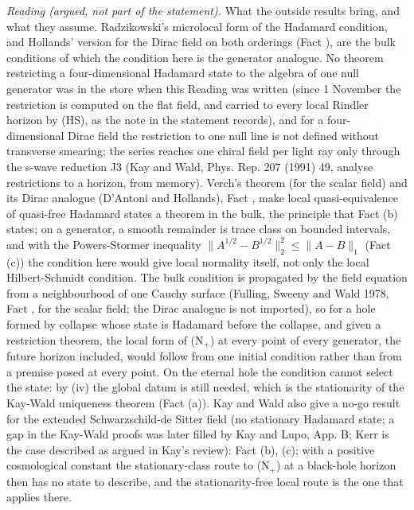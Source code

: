 \emph{Reading (argued, not part of the statement).} What the outside results bring, and what they assume. Radzikowski's microlocal form of the Hadamard condition, and Hollands' version for the Dirac field on both orderings (Fact ), are the bulk conditions of which the condition here is the generator analogue. No theorem restricting a four-dimensional Hadamard state to the algebra of one null generator was in the store when this Reading was written (since 1 November the restriction is computed on the flat field, and carried to every local Rindler horizon by (HS), as the note in the statement records), and for a four-dimensional Dirac field the restriction to one null line is not defined without transverse smearing; the series reaches one chiral field per light ray only through the s-wave reduction J3 (Kay and Wald, Phys. Rep. 207 (1991) 49, analyse restrictions to a horizon, from memory). Verch's theorem (for the scalar field) and its Dirac analogue (D'Antoni and Hollands), Fact , make local quasi-equivalence of quasi-free Hadamard states a theorem in the bulk, the principle that Fact (b) states; on a generator, a smooth remainder is trace class on bounded intervals, and with the Powers-Stormer inequality $\|A^{1/2} - B^{1/2}\|_{2}^{2} \le \|A - B\|_{1}$ (Fact (c)) the condition here would give local normality itself, not only the local Hilbert-Schmidt condition. The bulk condition is propagated by the field equation from a neighbourhood of one Cauchy surface (Fulling, Sweeny and Wald 1978, Fact , for the scalar field; the Dirac analogue is not imported), so for a hole formed by collapse whose state is Hadamard before the collapse, and given a restriction theorem, the local form of (N$_{+}$) at every point of every generator, the future horizon included, would follow from one initial condition rather than from a premise posed at every point. On the eternal hole the condition cannot select the state: by (iv) the global datum is still needed, which is the stationarity of the Kay-Wald uniqueness theorem (Fact (a)). Kay and Wald also give a no-go result for the extended Schwarzschild-de Sitter field (no stationary Hadamard state; a gap in the Kay-Wald proofs was later filled by Kay and Lupo, App. B; Kerr is the case described as argued in Kay's review): Fact (b), (c); with a positive cosmological constant the stationary-class route to (N$_{+}$) at a black-hole horizon then has no state to describe, and the stationarity-free local route is the one that applies there.

